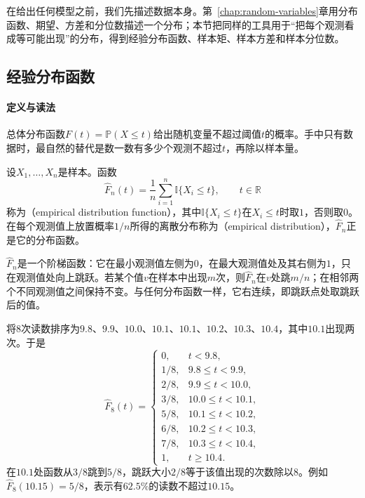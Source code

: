 在给出任何模型之前，我们先描述数据本身。第~\ref{chap:random-variables}章用分布函数、期望、方差和分位数描述一个分布；本节把同样的工具用于“把每个观测看成等可能出现”的分布，得到经验分布函数、样本矩、样本方差和样本分位数。

\subsection{经验分布函数}
\label{sec:est-empirical-cdf}

\paragraph{定义与读法}
总体分布函数$F(t)=\mathbb{P}(X\le t)$给出随机变量不超过阈值$t$的概率。手中只有数据时，最自然的替代是数一数有多少个观测不超过$t$，再除以样本量。

\begin{definition}[经验分布函数]
\label{def:est-empirical-cdf}
设$X_1,\dots,X_n$是样本。函数
\begin{equation}
\label{eq:est-empirical-cdf}
\hat F_n(t)=\frac1n\sum_{i=1}^n\mathbb{I}\{X_i\le t\},\qquad t\in\mathbb{R}
\end{equation}
称为（empirical distribution function），其中$\mathbb{I}\{X_i\le t\}$在$X_i\le t$时取$1$，否则取$0$。在每个观测值上放置概率$1/n$所得的离散分布称为（empirical distribution），$\hat F_n$正是它的分布函数。
\end{definition}

$\hat F_n$是一个阶梯函数：它在最小观测值左侧为$0$，在最大观测值处及其右侧为$1$，只在观测值处向上跳跃。若某个值$v$在样本中出现$m$次，则$\hat F_n$在$v$处跳$m/n$；在相邻两个不同观测值之间保持不变。与任何分布函数一样，它右连续，即跳跃点处取跳跃后的值。

\begin{example}[含重复值的读数]
\label{ex:est-ecdf-readings}
将$8$次读数排序为$9.8$、$9.9$、$10.0$、$10.1$、$10.1$、$10.2$、$10.3$、$10.4$，其中$10.1$出现两次。于是
\[
\hat F_8(t)=
\begin{cases}
0, & t<9.8,\\
1/8, & 9.8\le t<9.9,\\
2/8, & 9.9\le t<10.0,\\
3/8, & 10.0\le t<10.1,\\
5/8, & 10.1\le t<10.2,\\
6/8, & 10.2\le t<10.3,\\
7/8, & 10.3\le t<10.4,\\
1, & t\ge10.4 .
\end{cases}
\]
在$10.1$处函数从$3/8$跳到$5/8$，跳跃大小$2/8$等于该值出现的次数除以$8$。例如$\hat F_8(10.15)=5/8$，表示有$62.5\%$的读数不超过$10.15$。
\end{example}

